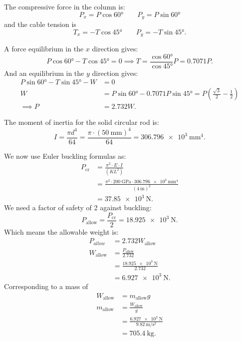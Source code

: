 \begin{derivation}
  The compressive force in the column is:
  \begin{equation*}
    P_x = P \cos \ang{60} \qquad P_y = P \sin \ang{60} 
  \end{equation*}
  and the cable tension is
  \begin{equation*}
    T_x = - T \cos \ang{45} \qquad P_y = - T \sin \ang{45} 
  .\end{equation*}
  
  A force equilibrium in the $x$ direction gives:
  \begin{equation*}
    P \cos \ang{60} - T \cos \ang{45} = 0 \implies T = \frac{\cos \ang{60} }{\cos \ang{45} }P = \num{0,7071} P
  .\end{equation*}
  And an equilibrium in the $y$ direction gives:
  \begin{align*}
    P \sin \ang{60} - T \sin \ang{45}  - W &= 0 \\
    W &= P \sin \ang{60} - \num{0,7071} P \sin \ang{45} = P \left( \frac{\sqrt{3}}{2} - \frac{1}{2} \right) \\
    \implies P &= \num{2,732} W
  .\end{align*}
  
  The moment of inertia for the solid circular rod is:
  \begin{equation*}
    I = \frac{\pi d^{4}}{64} = \frac{\pi \cdot \left( \qty{50}{\mm}  \right)^{4}}{64} = \qty{306,796e3}{\mm^{4}} 
  .\end{equation*}
  
  We now use Euler buckling formulas as:
  \begin{align*}
    P_{\mathrm{cr}} &= \frac{\pi^2 \cdot E \cdot I}{\left( KL^2 \right)} \\
                    &= \frac{\pi^2 \cdot \qty{200}{\GPa} \cdot \qty{306,796e3}{\mm^{4}} }{\left( \qty{4}{\m}  \right)^2} \\
                    &= \qty{37,85e3}{\N} 
  .\end{align*}
  We need a factor of safety of 2 against buckling:
  \begin{equation*}
    P_{\mathrm{allow}} = \frac{P_{\mathrm{cr}}}{2} = \qty{18,925e3}{\N} 
  .\end{equation*}
  Which means the allowable weight is:
  \begin{align*}
    P_{allow} &= \num{2,732} W_{\mathrm{allow}} \\
    W_{\mathrm{allow}} &= \frac{P_{\mathrm{allow}}}{\num{2,732} } \\
    &= \frac{\qty{18,925e3}{\N}}{\num{2,732} } \\
    &= \qty{6,927e3}{\N} 
  .\end{align*}
  Corresponding to a mass of
  \begin{align*}
    W_{\mathrm{allow}} &= m_{\mathrm{allow}}g \\
    m_{\mathrm{allow}} &= \frac{W_{\mathrm{allow}}}{g} \\
    &= \frac{\qty{6,927e3}{\N}}{\qty{9,82}{\m\per\s^2} } \\
    &= \qty{705,4}{\kg}
  .\end{align*}
\end{derivation}

